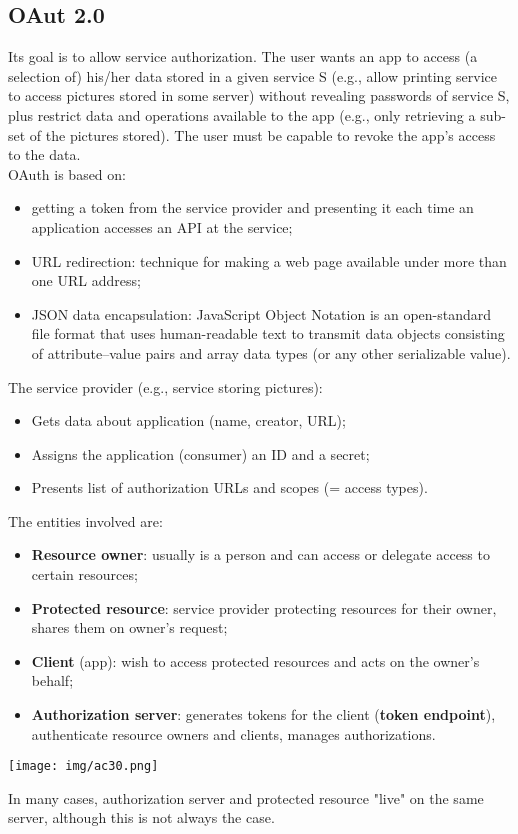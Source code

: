 \documentclass[a4paper, 10pt, titlepage]{article}
\begin{document}
\subsection{OAut 2.0}
Its goal is to allow service authorization.
The user wants an app to access (a selection of) his/her data stored in a given service S (e.g., allow printing service to access pictures stored in some server) without revealing passwords of service S, plus restrict data and operations available to the app (e.g., only retrieving a sub-set of the pictures stored). The user must be capable to revoke the app's access to the data. \medskip\\
OAuth is based on:
\begin{itemize}
\item getting a token from the service provider and presenting it each time an application accesses an API at the service;
\item URL redirection: technique for making a web page available under more than one URL address;
\item JSON data encapsulation: JavaScript Object Notation is an open-standard file format that uses human-readable text to transmit data objects consisting of attribute–value pairs and array data types (or any other serializable value).
\end{itemize}
The service provider (e.g., service storing pictures):
\begin{itemize}
\item Gets data about application (name, creator, URL);
\item Assigns the application (consumer) an ID and a secret;
\item Presents list of authorization URLs and scopes (= access types).
\end{itemize}
The entities involved are:
\begin{itemize}
\item \textbf{Resource owner}: usually is a person and can access or delegate access to certain resources; 
\item \textbf{Protected resource}: service provider protecting resources for their owner, shares them on owner’s request;
\item \textbf{Client} (app): wish to access protected resources and acts on the owner's behalf;
\item \textbf{Authorization server}: generates tokens for the client (\textbf{token endpoint}), authenticate resource owners and clients, manages authorizations.
\end{itemize}
\begin{center}
\texttt{[image: img/ac30.png]}
\end{center}
In many cases, authorization server and protected resource "live" on the same server, although this is not always the case.
\end{document}
